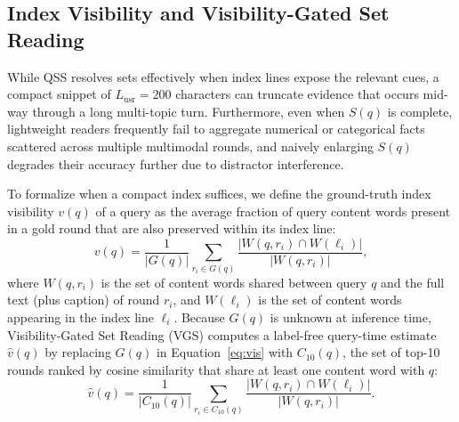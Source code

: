 \documentclass[10pt]{article}
\newcommand{\qss}{QSS}
\begin{document}
\subsection{Index Visibility and Visibility-Gated Set Reading}
\label{sec:vgs}

While \qss{} resolves sets effectively when index lines expose the relevant cues, a compact snippet of $L_{\mathrm{usr}}{=}200$ characters can truncate evidence that occurs mid-way through a long multi-topic turn. Furthermore, even when $S(q)$ is complete, lightweight readers frequently fail to aggregate numerical or categorical facts scattered across multiple multimodal rounds, and naively enlarging $S(q)$ degrades their accuracy further due to distractor interference.

To formalize when a compact index suffices, we define the ground-truth index visibility $v(q)$ of a query as the average fraction of query content words present in a gold round that are also preserved within its index line:
\begin{equation}
v(q) = \frac{1}{|G(q)|} \sum_{r_i \in G(q)} \frac{|W(q, r_i) \cap W(\ell_i)|}{|W(q, r_i)|},
\label{eq:vis}
\end{equation}
where $W(q, r_i)$ is the set of content words shared between query $q$ and the full text (plus caption) of round $r_i$, and $W(\ell_i)$ is the set of content words appearing in the index line $\ell_i$. Because $G(q)$ is unknown at inference time, Visibility-Gated Set Reading (VGS) computes a label-free query-time estimate $\hat{v}(q)$ by replacing $G(q)$ in Equation~\eqref{eq:vis} with $C_{10}(q)$, the set of top-10 rounds ranked by cosine similarity that share at least one content word with $q$:
\begin{equation}
\hat{v}(q) = \frac{1}{|C_{10}(q)|} \sum_{r_i \in C_{10}(q)} \frac{|W(q, r_i) \cap W(\ell_i)|}{|W(q, r_i)|}.
\label{eq:vhat}
\end{equation}
\end{document}

